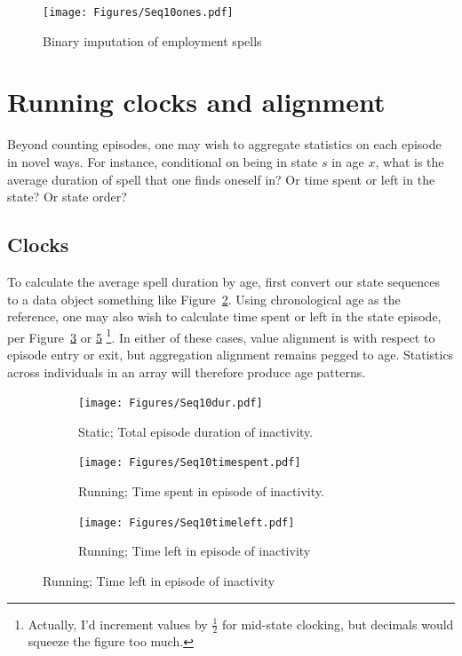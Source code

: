 \documentclass{article}
\begin{document}
 \begin{figure}[ht!]
\centering
\caption{Binary imputation of employment spells}
\label{fig:seq10ones}
\texttt{[image: Figures/Seq10ones.pdf]}
\end{figure}


\FloatBarrier
\section{Running clocks and alignment}
Beyond counting episodes, one may wish to aggregate statistics on each episode
in novel ways. For instance, conditional on being in state $s$ in age $x$, what
is the average duration of spell that one finds oneself in? Or time spent or
left in the state? Or state order?

\subsection{Clocks}
\label{sec:clocks}
To calculate the average spell duration by age, first convert our state
sequences to a data object something like Figure~\ref{fig:seq10dur}. Using chronological age as the reference, one may also wish to calculate time
spent or left in the state episode, per
Figure~\ref{fig:seq10timespent} or \ref{fig:seq10timeleft} \footnote{Actually,
I'd increment values by $\frac{1}{2}$ for mid-state clocking, but decimals would squeeze the figure too
much.}. In either of these cases, value alignment is with respect to episode
entry or exit, but aggregation alignment remains pegged to age. Statistics
across individuals in an array will therefore produce age patterns.

\begin{figure}[ht!]
\centering
\caption{Inactivity spells from Figure~\ref{fig:seq10}
are imputed with different duration count variables. It's probably better to add
$\frac{1}{2}$ to the displayed \emph{running} values. }
\label{fig:spentleft}

\begin{subfigure}{\textwidth}
\caption{Static; Total episode duration of inactivity.}
\label{fig:seq10dur}
\texttt{[image: Figures/Seq10dur.pdf]}
\end{subfigure}

\begin{subfigure}{\textwidth}
\caption{Running; Time spent in episode of inactivity.}
\label{fig:seq10timespent}
\texttt{[image: Figures/Seq10timespent.pdf]}
\end{subfigure}

\begin{subfigure}{\textwidth}
\caption{Running; Time left in episode of inactivity}
\label{fig:seq10timeleft}
\texttt{[image: Figures/Seq10timeleft.pdf]}
\end{subfigure}
\end{figure}
\end{document}
